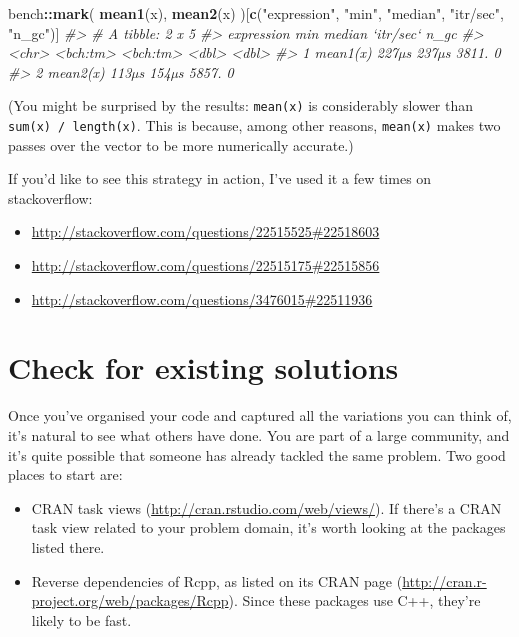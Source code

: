 \documentclass[]{book}
\newenvironment{Shaded}{\begin{snugshade}}{\end{snugshade}}
\newcommand{\CommentTok}[1]{\textcolor[rgb]{0.37,0.37,0.37}{\textit{#1}}}
\newcommand{\KeywordTok}[1]{\textcolor[rgb]{0.27,0.27,0.27}{\textbf{#1}}}
\newcommand{\NormalTok}[1]{#1}
\newcommand{\OperatorTok}[1]{\textcolor[rgb]{0.43,0.43,0.43}{\textbf{#1}}}
\newcommand{\StringTok}[1]{\textcolor[rgb]{0.5,0.5,0.5}{#1}}
\providecommand{\tightlist}{%
  \setlength{\itemsep}{0pt}\setlength{\parskip}{0pt}}
\renewcommand{\href}[2]{#2 (\url{#1})}
\begin{document}
\begin{Shaded}
\begin{Highlighting}[]
\NormalTok{bench}\OperatorTok{::}\KeywordTok{mark}\NormalTok{(}
  \KeywordTok{mean1}\NormalTok{(x),}
  \KeywordTok{mean2}\NormalTok{(x)}
\NormalTok{)[}\KeywordTok{c}\NormalTok{(}\StringTok{"expression"}\NormalTok{, }\StringTok{"min"}\NormalTok{, }\StringTok{"median"}\NormalTok{, }\StringTok{"itr/sec"}\NormalTok{, }\StringTok{"n_gc"}\NormalTok{)]}
\CommentTok{#> # A tibble: 2 x 5}
\CommentTok{#>   expression      min   median `itr/sec`  n_gc}
\CommentTok{#>   <chr>      <bch:tm> <bch:tm>     <dbl> <dbl>}
\CommentTok{#> 1 mean1(x)      227µs    237µs     3811.     0}
\CommentTok{#> 2 mean2(x)      113µs    154µs     5857.     0}
\end{Highlighting}
\end{Shaded}

(You might be surprised by the results: \texttt{mean(x)} is considerably slower than \texttt{sum(x)\ /\ length(x)}. This is because, among other reasons, \texttt{mean(x)} makes two passes over the vector to be more numerically accurate.)

If you'd like to see this strategy in action, I've used it a few times on stackoverflow:

\begin{itemize}
\tightlist
\item
  \url{http://stackoverflow.com/questions/22515525\#22518603}
\item
  \url{http://stackoverflow.com/questions/22515175\#22515856}
\item
  \url{http://stackoverflow.com/questions/3476015\#22511936}
\end{itemize}

\hypertarget{already-solved}{%
\section{Check for existing solutions}\label{already-solved}}

Once you've organised your code and captured all the variations you can think of, it's natural to see what others have done. You are part of a large community, and it's quite possible that someone has already tackled the same problem. Two good places to start are:

\begin{itemize}
\item
  \href{http://cran.rstudio.com/web/views/}{CRAN task views}. If there's a
  CRAN task view related to your problem domain, it's worth looking at
  the packages listed there.
\item
  Reverse dependencies of Rcpp, as listed on its
  \href{http://cran.r-project.org/web/packages/Rcpp}{CRAN page}. Since these
  packages use C++, they're likely to be fast.
\end{itemize}
\end{document}
